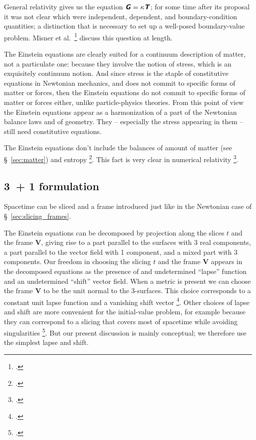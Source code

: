 \documentclass[\ifafour a4paper,12pt,\else a5paper,10pt,\fi%
onecolumn,oneside,article,%
british%
]{memoir}
\theoremstyle{remark}
\theoremstyle{innote}
\newcommand*{\mathte}[1]{\textbf{\textit{\textsf{#1}}}}
\newcommand*{\citep}{\footcites}
\newcommand*{\citey}{\footcites}%
\renewcommand*{\|}[1][]{\nonscript\,#1\vert\nonscript\;\mathopen{}}
\newcommand*{\sect}{\S}%
\newcommand*{\chap}{ch.}%
\newcommand*{\etal}{{et al.}}
\newcommand*{\yGG}{G}
\newcommand*{\yG}{\mathte{\yGG}}
\newcommand*{\yTTf}{T}
\newcommand*{\yTf}{\mathte{\yTTf}}
\newcommand*{\ynn}{V}
\newcommand*{\yn}{\bm{\ynn}}
\begin{document}
General relativity gives us the equation $\yG=\kappa\yTf$; for some time
after its proposal it was not clear which were independent, dependent, and
boundary-condition quantities; a distinction that is necessary to set up a
well-posed boundary-value problem. Misner \etal\
\citey[\chap~21]{misneretal1970_r1973} discuss this question at length.

The Einstein equations are clearly suited for a continuum description of
matter, not a particulate one: because they involve the notion of stress,
which is an exquisitely continuum notion. And since stress is the staple of
constitutive equations in Newtonian mechanics, and does not commit to
specific forms of matter or forces, then the Einstein equations do not
commit to specific forms of matter or forces either, unlike
particle-physics theories. From this point of view the Einstein equations
appear as a harmonization of a part of the Newtonian balance laws and of
geometry. They -- especially the stress appearing in them -- still need
constitutive equations.

The Einstein equations don't include the balances of amount of matter (see
\sect~\ref{sec:matter}) and entropy
\citep{eckart1940c}[\chap~22]{misneretal1970_r1973}. This fact is very
clear in numerical relativity
\citep[p.~1918]{disconzi2014}[\sect~2.2]{wilsonetal2003_r2007}[\sect~6.3.2]{gourgoulhon2007_r2012}[\chap~5]{baumgarteetal2010}[\sect~2.3]{rezzollaetal2013}.



 
\subsection{3~+ 1 formulation}
\label{sec:3-1_formulation}

Spacetime can be sliced and a frame introduced just like in the Newtonian
case of \sect~\ref{sec:slicing_frames}.

The Einstein equations can be decomposed by projection along the slices $t$
and the frame $\yn$, giving rise to a part parallel to the surfaces with
3\;\texttimes\;3 real components, a part parallel to the vector field with
1 component, and a mixed part with 3 components. Our freedom in choosing
the slicing $t$ and the frame $\yn$ appears in the decomposed equations
as the presence of and undetermined \enquote{lapse} function and an
undetermined \enquote{shift} vector field. When a metric is present we can
choose the frame $\yn$ to be the unit normal to the 3-surfaces. This choice
corresponds to a constant unit lapse function and a vanishing shift vector
\citep{smarretal1978,smarretal1980}. Other choices of lapse and shift are
more convenient for the initial-value problem, for example because they can
correspond to a slicing that covers most of spacetime while avoiding
singularities \citep{smarretal1978}. But our present discussion is mainly
conceptual; we therefore use the simplest lapse and shift.
\end{document}
